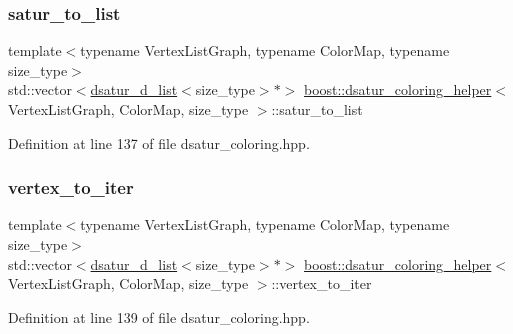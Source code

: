 \subsubsection{\texorpdfstring{satur\+\_\+to\+\_\+list}{satur\_to\_list}}
{\footnotesize\ttfamily template$<$typename Vertex\+List\+Graph, typename Color\+Map, typename size\+\_\+type$>$ \\
std\+::vector$<$\hyperlink{structboost_1_1dsatur__d__list}{dsatur\+\_\+d\+\_\+list}$<$size\+\_\+type$>$$\ast$$>$ \hyperlink{classboost_1_1dsatur__coloring__helper}{boost\+::dsatur\+\_\+coloring\+\_\+helper}$<$ Vertex\+List\+Graph, Color\+Map, size\+\_\+type $>$\+::satur\+\_\+to\+\_\+list\hspace{0.3cm}{\ttfamily [private]}}



Definition at line 137 of file dsatur\+\_\+coloring.\+hpp.

\mbox{\label{classboost_1_1dsatur__coloring__helper_abcf3872c0cc7f404e27d03ab3c22e2f5}} 
\subsubsection{\texorpdfstring{vertex\+\_\+to\+\_\+iter}{vertex\_to\_iter}}
{\footnotesize\ttfamily template$<$typename Vertex\+List\+Graph, typename Color\+Map, typename size\+\_\+type$>$ \\
std\+::vector$<$\hyperlink{structboost_1_1dsatur__d__list}{dsatur\+\_\+d\+\_\+list}$<$size\+\_\+type$>$$\ast$$>$ \hyperlink{classboost_1_1dsatur__coloring__helper}{boost\+::dsatur\+\_\+coloring\+\_\+helper}$<$ Vertex\+List\+Graph, Color\+Map, size\+\_\+type $>$\+::vertex\+\_\+to\+\_\+iter\hspace{0.3cm}{\ttfamily [private]}}



Definition at line 139 of file dsatur\+\_\+coloring.\+hpp.

\mbox{\label{classboost_1_1dsatur__coloring__helper_a19707dd47b634e8d1818d7583ee30f9d}} 
